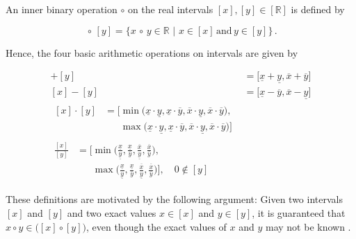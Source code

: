 \noindent
An inner binary operation $\circ$ on the real intervals $[x], [y] \in [\mathbb{R}]$ is defined by
 
 \begin{equation}
  [x] {\,\circ\,} [y] = \big\{ x {\,\circ\,} y \in \mathbb{R}\,\,|\,\, x \in [x] \,\mbox{and}\, y \in [y] \big\}\,.
\end{equation}

\noindent
Hence, the four basic arithmetic operations on intervals are given by

\begin{align}
	[x] + [y] &= \Big[\underline{x} + \underline{y}, \overline{x} + \overline{y}\Big] \\
	[x] - [y] &= \Big[\underline{x} - \overline{y}, \overline{x} - \underline{y}\Big]\\
	\begin{split}
[x] \cdot [y] &= \Big[ \min\big(\underline{x} {\cdot} \underline{y}, \underline{x} \cdot \overline{y}, \overline{x} \cdot \underline{y}, \overline{x} \cdot \overline{y}\big), \\
&\mathrel{\phantom{=[}}\max\big(\underline{x} \cdot \underline{y}, \underline{x} \cdot \overline{y}, \overline{x} \cdot \underline{y}, \overline{x} \cdot \overline{y}\big) \Big]
\end{split} \\
\begin{split}
\frac{[x]}{[y]} &= \bigg[ \min\Big(\frac{\underline{x}}{\underline{y}}, \frac{\underline{x}}{\overline{y}}, \frac{\overline{x}}{\underline{y}}, \frac{\overline{x}}{\overline{y}}\Big), \\
&\mathrel{\phantom{=[}}\max\Big(\frac{\underline{x}}{\underline{y}}, \frac{\underline{x}}{\overline{y}}, \frac{\overline{x}}{\underline{y}}, \frac{\overline{x}}{\overline{y}}\Big) \bigg], \quad 0 \notin [y]
\end{split}
\end{align}

\noindent
These definitions are motivated by the following argument: Given two intervals $[x]$ and $[y]$ and two exact values $x \in [x]$ and $y \in [y]$, it is guaranteed that $x \circ y \in \big([x] \circ [y]\big)$, even though the exact values of $x$ and $y$ may not be known \cite{Rokne2001}.

